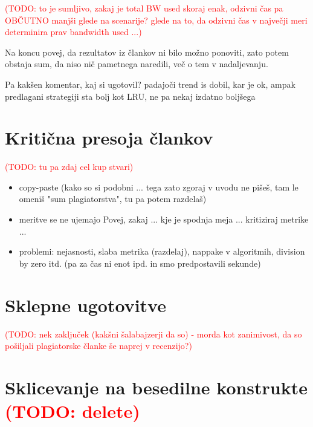 \documentclass[a4paper, 12pt]{book}
\newcommand{\TODO}[1]{\textcolor{red}{(TODO: #1)}}
\begin{document}
\TODO{to je sumljivo, zakaj je total BW used skoraj enak, odzivni čas
pa OBČUTNO manjši glede na scenarije? glede na to, da odzivni čas v
največji meri determinira prav bandwidth used ...}

Na koncu povej, da rezultatov iz člankov ni bilo možno ponoviti, zato potem
obstaja sum, da niso nič pametnega naredili, več o tem v nadaljevanju.

Pa kakšen komentar, kaj si ugotovil? padajoči trend is dobil, kar je ok,
ampak predlagani strategiji sta bolj kot LRU, ne pa nekaj izdatno boljšega

\chapter{Kritična presoja člankov}

\TODO{tu pa zdaj cel kup stvari}

\begin{itemize}
\item copy-paste (kako so si podobni ... tega zato zgoraj v uvodu ne pišeš, tam
le omeniš "sum plagiatorstva", tu pa potem razdelaš)

\item meritve se ne ujemajo
Povej, zakaj ... kje je spodnja meja ... kritiziraj metrike ...

\item problemi: nejasnosti, slaba metrika (razdelaj), nappake v algoritmih,
division by zero itd. (pa za čas ni enot ipd. in smo predpostavili sekunde)

\end{itemize}


\chapter{Sklepne ugotovitve}
\TODO{nek zaključek (kakšni šalabajzerji da so) - morda kot zanimivost, da
so pošiljali plagiatorske članke še naprej v recenzijo?}



\chapter*{Sklicevanje na besedilne konstrukte \TODO{delete}}
\end{document}

